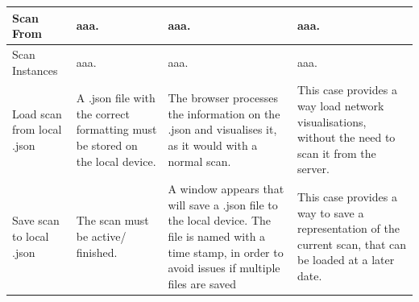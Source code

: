 \documentclass[a4paper,12pt]{report}
\begin{document}
\begin{center}
\begin{longtable}{| p{3cm} | p{4cm} | p{4cm} | p{4cm} |}
    Scan From &  aaa. & aaa.  &  aaa.\\ 
    \hline
    Scan Instances &  aaa. & aaa.  &  aaa.\\ 
    \hline
    
    Load scan from local .json & A .json file with the correct formatting must be stored on the local device. & The browser processes the information on the .json and visualises it, as it would with a normal scan. & This case provides a way load network visualisations, without the need to scan it from the server.\\ \hline
    Save scan to local .json & The scan must be active/ finished. & A window appears that will save a .json file to the local device. The file is named with a time stamp, in order to avoid issues if multiple files are saved & This case provides a way to save a representation of the current scan, that can be loaded at a later date.\\ 
    \hline
  \end{longtable}
\end{center}
\newpage
\end{document}
